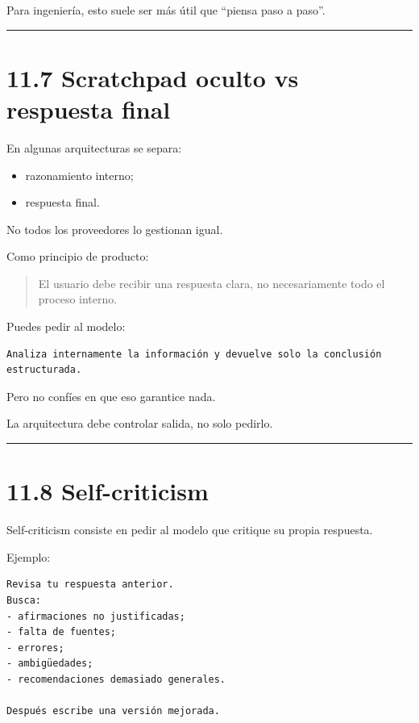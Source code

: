 Para ingeniería, esto suele ser más útil que ``piensa paso a paso''.

\begin{center}\rule{0.5\linewidth}{0.5pt}\end{center}

\section{11.7 Scratchpad oculto vs respuesta
final}\label{scratchpad-oculto-vs-respuesta-final}

En algunas arquitecturas se separa:

\begin{itemize}
\tightlist
\item
  razonamiento interno;
\item
  respuesta final.
\end{itemize}

No todos los proveedores lo gestionan igual.

Como principio de producto:

\begin{quote}
El usuario debe recibir una respuesta clara, no necesariamente todo el
proceso interno.
\end{quote}

Puedes pedir al modelo:

\begin{lstlisting}
Analiza internamente la información y devuelve solo la conclusión estructurada.
\end{lstlisting}

Pero no confíes en que eso garantice nada.

La arquitectura debe controlar salida, no solo pedirlo.

\begin{center}\rule{0.5\linewidth}{0.5pt}\end{center}

\section{11.8 Self-criticism}\label{self-criticism-1}

Self-criticism consiste en pedir al modelo que critique su propia
respuesta.

Ejemplo:

\begin{lstlisting}
Revisa tu respuesta anterior.
Busca:
- afirmaciones no justificadas;
- falta de fuentes;
- errores;
- ambigüedades;
- recomendaciones demasiado generales.

Después escribe una versión mejorada.
\end{lstlisting}

